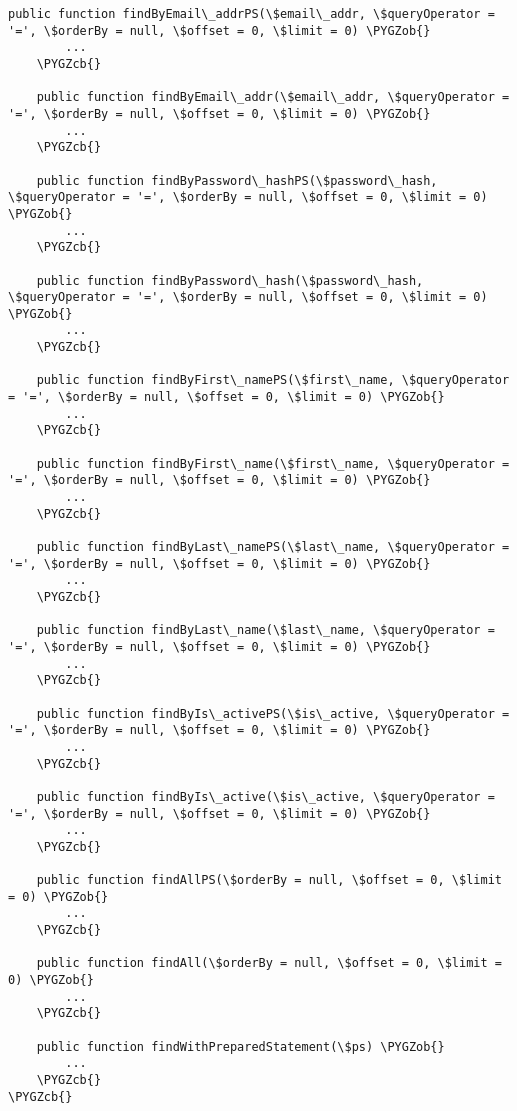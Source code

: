 \documentclass[letterpaper,10pt,english]{sphinxmanual}
\def\PYGZob{\char`\{}
\def\PYGZcb{\char`\}}
\begin{document}
\begin{Verbatim}[commandchars=\\\{\}]
    public function findByEmail\_addrPS(\$email\_addr, \$queryOperator = '=', \$orderBy = null, \$offset = 0, \$limit = 0) \PYGZob{}
        ...
    \PYGZcb{}

    public function findByEmail\_addr(\$email\_addr, \$queryOperator = '=', \$orderBy = null, \$offset = 0, \$limit = 0) \PYGZob{}
        ...
    \PYGZcb{}

    public function findByPassword\_hashPS(\$password\_hash, \$queryOperator = '=', \$orderBy = null, \$offset = 0, \$limit = 0) \PYGZob{}
        ...
    \PYGZcb{}

    public function findByPassword\_hash(\$password\_hash, \$queryOperator = '=', \$orderBy = null, \$offset = 0, \$limit = 0) \PYGZob{}
        ...
    \PYGZcb{}

    public function findByFirst\_namePS(\$first\_name, \$queryOperator = '=', \$orderBy = null, \$offset = 0, \$limit = 0) \PYGZob{}
        ...
    \PYGZcb{}

    public function findByFirst\_name(\$first\_name, \$queryOperator = '=', \$orderBy = null, \$offset = 0, \$limit = 0) \PYGZob{}
        ...
    \PYGZcb{}

    public function findByLast\_namePS(\$last\_name, \$queryOperator = '=', \$orderBy = null, \$offset = 0, \$limit = 0) \PYGZob{}
        ...
    \PYGZcb{}

    public function findByLast\_name(\$last\_name, \$queryOperator = '=', \$orderBy = null, \$offset = 0, \$limit = 0) \PYGZob{}
        ...
    \PYGZcb{}

    public function findByIs\_activePS(\$is\_active, \$queryOperator = '=', \$orderBy = null, \$offset = 0, \$limit = 0) \PYGZob{}
        ...
    \PYGZcb{}

    public function findByIs\_active(\$is\_active, \$queryOperator = '=', \$orderBy = null, \$offset = 0, \$limit = 0) \PYGZob{}
        ...
    \PYGZcb{}

    public function findAllPS(\$orderBy = null, \$offset = 0, \$limit = 0) \PYGZob{}
        ...
    \PYGZcb{}

    public function findAll(\$orderBy = null, \$offset = 0, \$limit = 0) \PYGZob{}
        ...
    \PYGZcb{}

    public function findWithPreparedStatement(\$ps) \PYGZob{}
        ...
    \PYGZcb{}
\PYGZcb{}
\end{Verbatim}
\end{document}
